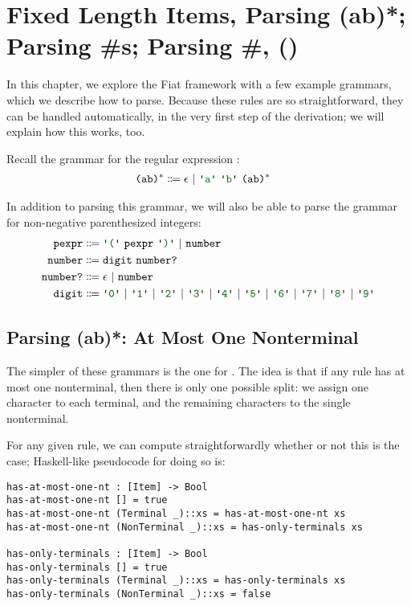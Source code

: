 \chapter{Fixed Length Items, Parsing (ab)*; Parsing \#s; Parsing \#, ()} \label{ch:fixed-length}
  In this chapter, we explore the Fiat framework with a few example grammars, which we describe how to parse.  Because these rules are so straightforward, they can be handled automatically, in the very first step of the derivation; we will explain how this works, too.

  Recall the grammar for the regular expression :
  \begin{align*}
    \nt{(ab)$^*$} & \Coloneqq \nt{$\epsilon$}~|~\terminal{a}~\terminal{b}~\nt{(ab)$^*$}
  \end{align*}

  In addition to parsing this grammar, we will also be able to parse the grammar for non-negative parenthesized integers:
  \begin{align*}
    \nt{pexpr} & \Coloneqq \terminal{(}~\nt{pexpr}~\terminal{)}~|~\nt{number} \\
    \nt{number} & \Coloneqq \nt{digit}~\nt{number?} \\
    \nt{number?} & \Coloneqq \epsilon~|~\nt{number} \\
    \nt{digit} & \Coloneqq \terminal{0}~|~\terminal{1}~|~\terminal{2}~|~\terminal{3}~|~\terminal{4}~|~\terminal{5}~|~\terminal{6}~|~\terminal{7}~|~\terminal{8}~|~\terminal{9}
  \end{align*}

  \section{Parsing (ab)*: At Most One Nonterminal}
    The simpler of these grammars is the one for .  The idea is that if any rule has at most one nonterminal, then there is only one possible split: we assign one character to each terminal, and the remaining characters to the single nonterminal.

    For any given rule, we can compute straightforwardly whether or not this is the case; Haskell-like pseudocode for doing so is:
\begin{verbatim}
has-at-most-one-nt : [Item] -> Bool
has-at-most-one-nt [] = true
has-at-most-one-nt (Terminal _)::xs = has-at-most-one-nt xs
has-at-most-one-nt (NonTerminal _)::xs = has-only-terminals xs

has-only-terminals : [Item] -> Bool
has-only-terminals [] = true
has-only-terminals (Terminal _)::xs = has-only-terminals xs
has-only-terminals (NonTerminal _)::xs = false
\end{verbatim}

